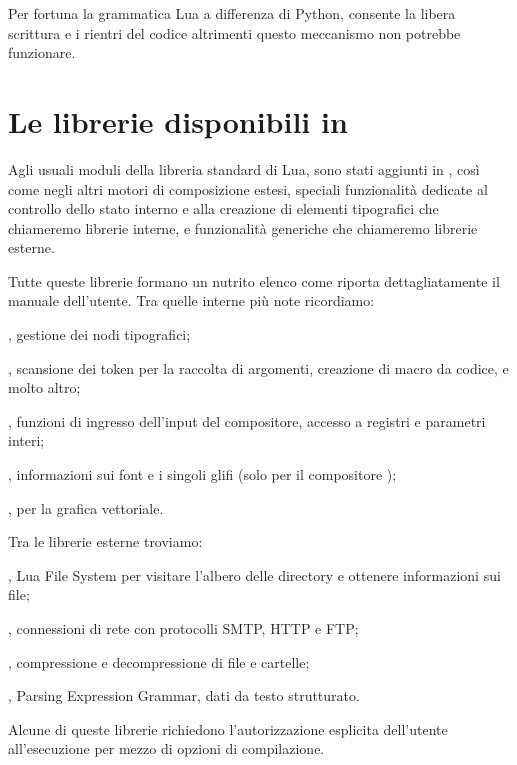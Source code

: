 Per fortuna la grammatica Lua a differenza di Python, consente la libera
scrittura e i rientri del codice altrimenti questo meccanismo non potrebbe
funzionare.


\section{Le librerie disponibili in \LuaTeX}
\label{iSecLuaTeXLibraries}

Agli usuali moduli della libreria standard di Lua, sono stati aggiunti in
\LuaTeX{}, così come negli altri motori di composizione estesi, speciali
funzionalità dedicate al controllo dello stato interno e alla creazione di
elementi tipografici che chiameremo librerie interne, e funzionalità generiche
che chiameremo librerie esterne.

Tutte queste librerie formano un nutrito elenco come riporta dettagliatamente il
manuale dell'utente. Tra quelle interne più note ricordiamo:
\begin{compactitemize}
\item {}, gestione dei nodi tipografici;
\item {}, scansione dei token per la raccolta di argomenti, creazione
di macro da codice, e molto altro;
\item {}, funzioni di ingresso dell'input del compositore, accesso a
registri e parametri interi;
\item {}, informazioni sui font e i singoli glifi (solo per il
compositore );
\item {},  per la grafica vettoriale.
\end{compactitemize}

Tra le librerie esterne troviamo:
\begin{compactitemize}
\item {}, Lua File System per visitare l'albero delle directory e
ottenere informazioni sui file;
\item {}, connessioni di rete con protocolli SMTP, HTTP e FTP;
\item {}, compressione e decompressione di file e cartelle;
\item {}, Parsing Expression Grammar, dati da testo strutturato.
\end{compactitemize}

Alcune di queste librerie richiedono l'autorizzazione esplicita dell'utente
all'esecuzione per mezzo di opzioni di compilazione.



